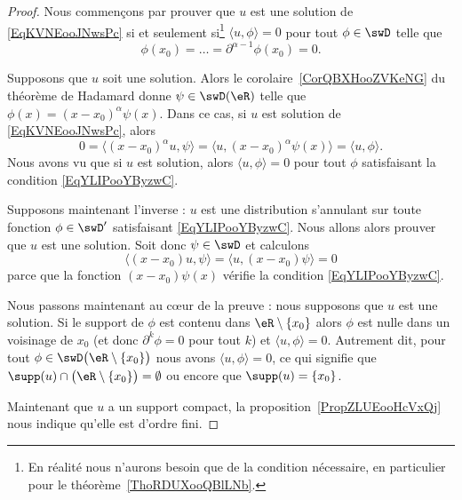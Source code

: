 \begin{proof}
	Nous commençons par prouver que \( u\) est une solution de \eqref{EqKVNEooJNwsPc} si et seulement si\footnote{En réalité nous n'aurons besoin que de la condition nécessaire, en particulier pour le théorème~\ref{ThoRDUXooQBlLNb}.} \( \langle u, \phi\rangle =0\) pour tout \( \phi\in\swD\) telle que
	\begin{equation}    \label{EqYLIPooYByzwC}
		\phi(x_0)=\ldots=\partial^{\alpha-1}\phi(x_0)=0.
	\end{equation}
	\begin{subproof}
		Supposons que \( u\) soit une solution. Alors le corolaire~\ref{CorQBXHooZVKeNG} du théorème de Hadamard donne \( \psi\in\swD(\eR)\) telle que
		\( \phi(x)=(x-x_0)^{\alpha}\psi(x)\).
		Dans ce cas, si \( u\) est solution de \eqref{EqKVNEooJNwsPc}, alors
		\begin{equation}
			0=\langle (x-x_0)^{\alpha}u, \psi\rangle =\langle u, (x-x_0)^{\alpha}\psi(x)\rangle =\langle u, \phi\rangle .
		\end{equation}
		Nous avons vu que si \( u\) est solution, alors \( \langle u, \phi\rangle =0\) pour tout \( \phi\) satisfaisant la condition \eqref{EqYLIPooYByzwC}.

		Supposons maintenant l'inverse : \( u\) est une distribution s'annulant sur toute fonction \( \phi\in\swD'\) satisfaisant \eqref{EqYLIPooYByzwC}. Nous allons alors prouver que \( u\) est une solution. Soit donc \( \psi\in \swD\) et calculons
		\begin{equation}
			\langle (x-x_0)u, \psi\rangle =\langle u, (x-x_0)\psi\rangle =0
		\end{equation}
		parce que la fonction \( (x-x_0)\psi(x)\) vérifie la condition \eqref{EqYLIPooYByzwC}.
	\end{subproof}

	Nous passons maintenant au cœur de la preuve : nous supposons que \( u\) est une solution. Si le support de \( \phi\) est contenu dans \( \eR\setminus\{ x_0 \}\) alors \( \phi\) est nulle dans un voisinage de \( x_0\) (et donc \( \partial^k\phi=0\) pour tout \( k\)) et \( \langle u, \phi\rangle =0\). Autrement dit, pour  tout \( \phi\in\swD\big( \eR\setminus\{ x_0 \} \big)\) nous avons \( \langle u, \phi\rangle =0\), ce qui signifie que \( \supp(u)\cap\big( \eR\setminus\{ x_0 \} \big)=\emptyset\) ou encore que \( \supp(u)=\{ x_0 \}\).

	Maintenant que \( u\) a un support compact, la proposition~\ref{PropZLUEooHcVxQj} nous indique qu'elle est d'ordre fini.
\end{proof}

